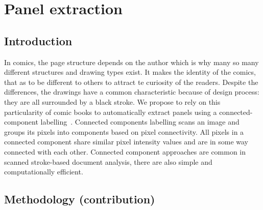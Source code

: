 \chapter{Panel extraction}
\label{chap:pe}
\graphicspath{{./chapters/4-pe/figs/}}


\section{Introduction}
\label{sec:pe:introduction}

In comics, the page structure depends on the author which is why many so many different structures and drawing types exist.
It makes the identity of the comics, that as to be different to others to attract te curiosity of the readers.
Despite the differences, the drawings have a common characteristic because of design process: they are all surrounded by a black stroke.
We propose to rely on this particularity of comic books to automatically extract panels  using a connected-component labelling~\cite{Szeliski2010Computer}.
Connected components labelling scans an image and groups its pixels into components based on pixel connectivity.
All pixels in a connected component share similar pixel intensity values and are in some way connected with each other.
Connected component approaches are common in scanned stroke-based document analysis, there are also simple and computationally efficient.






\section{Methodology (contribution)}
\label{sec:pe:methodology}

